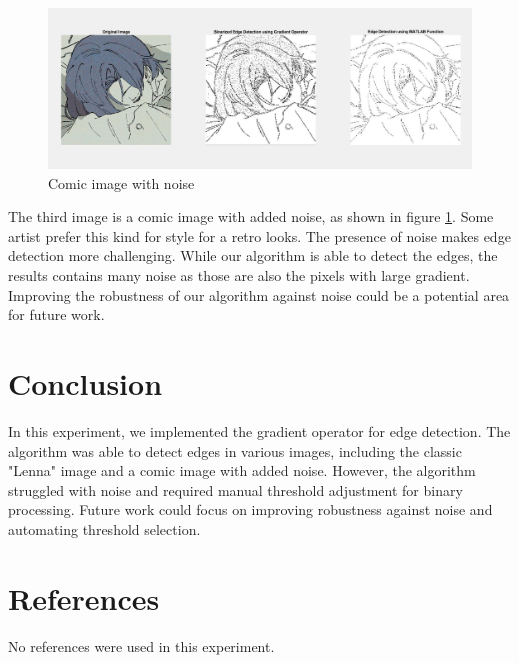 \documentclass[a4paper,11pt]{article}
\begin{document}
\begin{figure}[H]
    \centering
    \includegraphics[width=0.8\linewidth]{Demo3-Noise.jpg}
    \caption{Comic image with noise}
    \label{pic:Demo_3}
\end{figure}
The third image is a comic image with added noise, as shown in figure \ref{pic:Demo_3}. Some artist prefer this kind for style for a retro looks. The presence of noise makes edge detection more challenging. While our algorithm is able to detect the edges, the results contains many noise as those are also the pixels with large gradient. Improving the robustness of our algorithm against noise could be a potential area for future work.

\section{Conclusion}
In this experiment, we implemented the gradient operator for edge detection. The algorithm was able to detect edges in various images, including the classic "Lenna" image and a comic image with added noise. However, the algorithm struggled with noise and required manual threshold adjustment for binary processing. Future work could focus on improving robustness against noise and automating threshold selection.

\section{References}
No references were used in this experiment.
\end{document}
